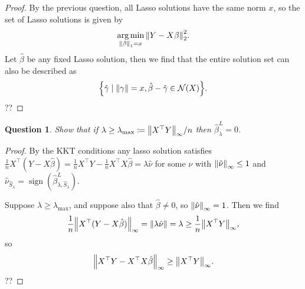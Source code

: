 \documentclass{article}
\theoremstyle{plain}
\newtheorem{question}{Question}
\theoremstyle{remark}
\newcommand{\Cal}{\mathcal}
\newcommand{\Rm}{\mathrm}
\newcommand{\T}{^\top} %
\newcommand\ceq\coloneqq %
\DeclareMathOperator{\sign}{sign}
\DeclareMathOperator*{\argmin}{arg\,min}
\newcommand\Nul{\Cal N}
\begin{document}
\begin{proof}
	By the previous question, all Lasso solutions have the same norm $x$, so the set of Lasso solutions is given by
	\[
	\argmin_{\norm{\beta}_1 = x} \norm{Y - X\beta}_2^2.
	\]
	Let $\hat\beta$ be any fixed Lasso solution, then we find that the entire solution set can also be described as
	\[
	\qty{\hat\gamma \mid \norm{\gamma} = x, \hat\beta - \hat\gamma \in \Nul(X)}. 
	\]
	??
\end{proof}

\begin{question}
	Show that if $\lambda \geq \lambda_\Rm{max} \ceq \norm{X\T Y}_\infty / n$ then $\hat\beta_\lambda^L = 0$. 
\end{question}

\begin{proof}
	By the KKT conditions any lasso solution satisfies $\frac1n X\T (Y - X\hat\beta) = \frac1n X\T Y - \frac1n X\T X\hat\beta= \lambda \hat\nu$ for some $\nu$ with $\norm{\hat\nu}_\infty \leq 1$ and $\hat\nu_{\hat S_{\lambda}} = \sign(\hat\beta^L_{\lambda, \hat S_\lambda})$. 
	
	Suppose $\lambda \geq \lambda_\Rm{max}$, and suppose also that $\hat\beta \neq 0$, so $\norm{\hat\nu}_\infty = 1$. Then we find
	\[
	\frac1n \norm{X\T (Y - X\hat\beta)}_\infty = \norm{\lambda\hat\nu} = \lambda  \geq \frac1n \norm{X\T Y}_\infty, 
	\]
	so 
	\[
	\norm{X\T Y - X\T X\hat\beta}_\infty \geq \norm{X\T Y}_\infty. 
	\]
	??
\end{proof}
\end{document}

